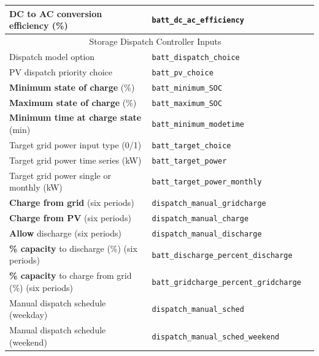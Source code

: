 \documentclass[12pt,letterpaper]{article}
\begin{document}
\begin{table}
\begin{center}
\begin{tabular}{lll}
\textbf{DC to AC conversion efficiency} (\%) & \texttt{batt\_dc\_ac\_efficiency} \\
\midrule
\multicolumn{2}{c}{Storage Dispatch Controller Inputs}\\
Dispatch model option & \texttt{batt\_dispatch\_choice} \\
PV dispatch priority choice & \texttt{batt\_pv\_choice} \\
\textbf{Minimum state of charge} (\%) & \texttt{batt\_minimum\_SOC} \\
\textbf{Maximum state of charge} (\%) & \texttt{batt\_maximum\_SOC} \\
\textbf{Minimum time at charge state} (min) & \texttt{batt\_minimum\_modetime} \\
Target grid power input type (0/1) & \texttt{batt\_target\_choice}\\
Target grid power time series (kW) & \texttt{batt\_target\_power}\\
Target grid power single or monthly (kW) & \texttt{batt\_target\_power\_monthly}\\
\textbf{Charge from grid} (six periods) & \texttt{dispatch\_manual\_gridcharge} \\
\textbf{Charge from PV} (six periods) & \texttt{dispatch\_manual\_charge} \\
\textbf{Allow} discharge (six periods) & \texttt{dispatch\_manual\_discharge} \\
\textbf{\% capacity} to discharge (\%) (six periods) & \texttt{batt\_discharge\_percent\_discharge} \\
\textbf{\% capacity} to charge from grid (\%) (six periods) & \texttt{batt\_gridcharge\_percent\_gridcharge} \\
Manual dispatch schedule (weekday)& \texttt{dispatch\_manual\_sched} \\
Manual dispatch schedule (weekend)& \texttt{dispatch\_manual\_sched\_weekend} \\
\hline
\end{tabular}
\label{tab-batteryinputs}
\end{center}
\end{table}
\end{document}
